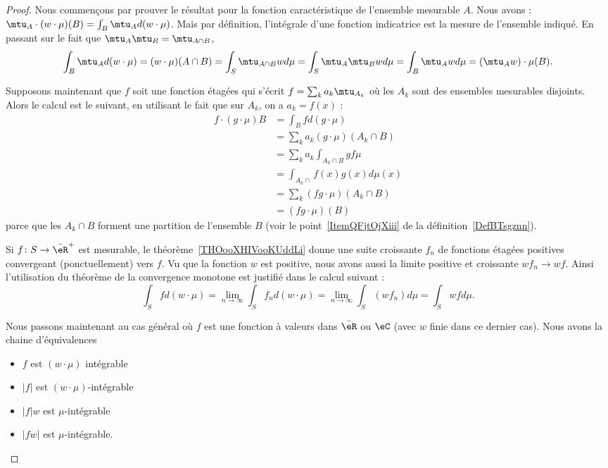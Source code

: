 \begin{proof}
	Nous commençons par prouver le résultat pour la fonction caractéristique de l'ensemble mesurable \( A\). Nous avons : \( \mtu_A\cdot(w\cdot \mu)(B)=\int_B\mtu_Ad(w\cdot \mu)\). Mais par définition, l'intégrale d'une fonction indicatrice est la mesure de l'ensemble indiqué. En passant sur le fait que \( \mtu_A\mtu_B=\mtu_{A\cap B}\),
	\begin{equation}
		\int_B\mtu_Ad(w\cdot \mu)=   (w\cdot\mu)(A\cap B)=\int_S\mtu_{A\cap B}wd\mu=\int_S\mtu_A\mtu_Bwd\mu=\int_B\mtu_Awd\mu=(\mtu_Aw)\cdot\mu(B).
	\end{equation}

	Supposons maintenant que \( f\) soit une fonction étagées qui s'écrit \( f=\sum_ka_k\mtu_{A_k}\) où les \( A_k\) sont des ensembles mesurables disjoints. Alors le calcul est le suivant, en utilisant le fait que sur \( A_k\), on a \( a_k=f(x)\) :
	\begin{subequations}
		\begin{align}
			f\cdot(g\cdot \mu)B & =\int_Bfd(g\cdot \mu)            \\
			                    & =\sum_ka_k(g\cdot\mu)(A_k\cap B) \\
			                    & =\sum_ka_k\int_{A_k\cap B}gf\mu  \\
			                    & =\int_{A_k\cap}f(x)g(x)d\mu(x)   \\
			                    & =\sum_k(fg\cdot\mu)(A_k\cap B)   \\
			                    & =(fg\cdot\mu)(B)
		\end{align}
	\end{subequations}
	parce que les \( A_k\cap B\) forment une partition de l'ensemble \( B\) (voir le point~\ref{ItemQFjtOjXiii} de la définition~\ref{DefBTsgznn}).

	Si \( f\colon S\to \bar\eR^+\) est mesurable, le théorème~\ref{THOooXHIVooKUddLi} donne une suite croissante \( f_n\) de fonctions étagées positives convergeant (ponctuellement) vers \( f\). Vu que la fonction \( w\) est positive, nous avons aussi la limite positive et croissante \( wf_n\to wf\). Ainsi l'utilisation du théorème de la convergence monotone est justifié dans le calcul suivant :
	\begin{equation}
		\int_Sfd(w\cdot \mu)=\lim_{n\to \infty} \int_Sf_nd(w\cdot\mu)=\lim_{n\to \infty} \int_S(wf_n)d\mu=\int_Swfd\mu.
	\end{equation}

	Nous passons maintenant au cas général où \( f\) est une fonction à valeurs dans \( \bar\eR\) ou \( \eC\) (avec \( w\) finie dans ce dernier cas). Nous avons la chaine d'équivalences
	\begin{itemize}
		\renewcommand{\labelitemi}{\( \Leftrightarrow\)}
		\item \( f\) est \( (w\cdot\mu)\) intégrable
		\item \( | f |\) est \( (w\cdot\mu)\)-intégrable
		\item \( | f |w\) est \( \mu\)-intégrable
		\item \( | fw |\) est \( \mu\)-intégrable.
	\end{itemize}


\end{proof}
